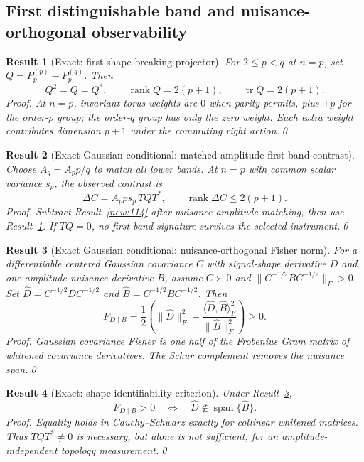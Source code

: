 \documentclass[aps,prd,onecolumn,notitlepage,groupedaddress,11pt]{revtex4-2}
\newtheorem{result}{Result}
\begin{document}
\subsection{First distinguishable band and nuisance-orthogonal observability}
\begin{result}[\textsf{Exact}: first shape-breaking projector]\label{new:119}
For $2\le p<q$ at $n=p$, set $Q=P_p^{(p)}-P_p^{(q)}$. Then
\begin{equation}\label{new:eq119}
Q^2=Q=Q^*,\qquad\operatorname{rank}Q=2(p+1),\qquad \operatorname{tr}Q=2(p+1).
\end{equation}
\textit{Proof.} At $n=p$, invariant torus weights are $0$ when parity permits, plus $\pm p$ for the order-$p$ group; the order-$q$ group has only the zero weight. Each extra weight contributes dimension $p+1$ under the commuting right action.\qed
\end{result}
\begin{result}[\textsf{Exact Gaussian conditional}: matched-amplitude first-band contrast]\label{new:120}
Choose $A_q=A_p p/q$ to match all lower bands. At $n=p$ with common scalar variance $s_p$, the observed contrast is
\begin{equation}\label{new:eq120}
\Delta C=A_p p s_p\,TQT^*,\qquad \operatorname{rank}\Delta C\le2(p+1).
\end{equation}
\textit{Proof.} Subtract Result~\ref{new:114} after nuisance-amplitude matching, then use Result~\ref{new:119}. If $TQ=0$, no first-band signature survives the selected instrument.\qed
\end{result}
\begin{result}[\textsf{Exact Gaussian conditional}: nuisance-orthogonal Fisher norm]\label{new:121}
For a differentiable centered Gaussian covariance $C$ with signal-shape derivative $D$ and one amplitude-nuisance derivative $B$, assume $C\succ0$ and $\|C^{-1/2}BC^{-1/2}\|_F>0$. Set $\widehat D=C^{-1/2}DC^{-1/2}$ and $\widehat B=C^{-1/2}BC^{-1/2}$. Then
\begin{equation}\label{new:eq121}
F_{D\mid B}=\frac12\left(\|\widehat D\|_F^2-\frac{\langle\widehat D,\widehat B\rangle_F^2}{\|\widehat B\|_F^2}\right)\ge0.
\end{equation}
\textit{Proof.} Gaussian covariance Fisher is one half of the Frobenius Gram matrix of whitened covariance derivatives. The Schur complement removes the nuisance span.\qed
\end{result}
\begin{result}[\textsf{Exact}: shape-identifiability criterion]\label{new:122}
Under Result~\ref{new:121},
\begin{equation}\label{new:eq122}
F_{D\mid B}>0\quad\Longleftrightarrow\quad \widehat D\notin\operatorname{span}\{\widehat B\}.
\end{equation}
\textit{Proof.} Equality holds in Cauchy--Schwarz exactly for collinear whitened matrices. Thus $TQT^*\ne0$ is necessary, but alone is not sufficient, for an amplitude-independent topology measurement.\qed
\end{result}
\end{document}
